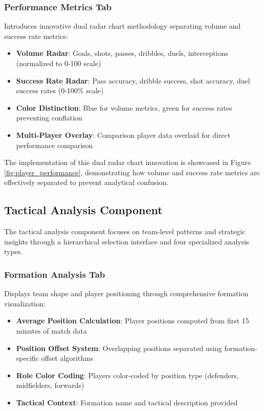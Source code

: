 \documentclass[12pt,a4paper]{article}
\begin{document}
\subsubsection{Performance Metrics Tab}
\label{sec:performance_metrics}
Introduces innovative dual radar chart methodology separating volume and success rate metrics:
\begin{itemize}
    \item \textbf{Volume Radar}: Goals, shots, passes, dribbles, duels, interceptions (normalized to 0-100 scale)
    \item \textbf{Success Rate Radar}: Pass accuracy, dribble success, shot accuracy, duel success rates (0-100\% scale)
    \item \textbf{Color Distinction}: Blue for volume metrics, green for success rates preventing conflation
    \item \textbf{Multi-Player Overlay}: Comparison player data overlaid for direct performance comparison
\end{itemize}

The implementation of this dual radar chart innovation is showcased in Figure \ref{fig:player_performance}, demonstrating how volume and success rate metrics are effectively separated to prevent analytical confusion.



\subsection{Tactical Analysis Component}
\label{sec:tactical_analysis}

The tactical analysis component focuses on team-level patterns and strategic insights through a hierarchical selection interface and four specialized analysis types.

\subsubsection{Formation Analysis Tab}
\label{sec:tactical_formation}
Displays team shape and player positioning through comprehensive formation visualization:
\begin{itemize}
    \item \textbf{Average Position Calculation}: Player positions computed from first 15 minutes of match data
    \item \textbf{Position Offset System}: Overlapping positions separated using formation-specific offset algorithms
    \item \textbf{Role Color Coding}: Players color-coded by position type (defenders, midfielders, forwards)
    \item \textbf{Tactical Context}: Formation name and tactical description provided
\end{itemize}
\end{document}
